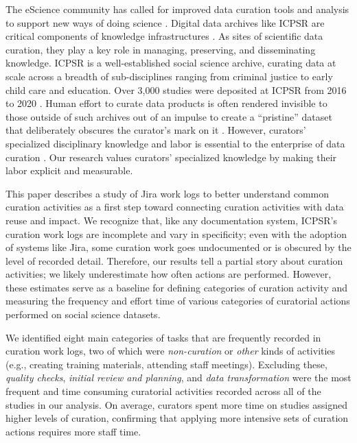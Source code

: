 \documentclass[conference]{IEEEtran}
\begin{document}
The eScience community has called for improved data curation tools and analysis to support new ways of doing science \cite{Hey2009-lk}. Digital data archives like ICPSR are critical components of knowledge infrastructures \cite{Borgman2019-ha}. As sites of scientific data curation, they play a key role in managing, preserving, and disseminating knowledge. ICPSR is a well-established social science archive, curating data at scale across a breadth of sub-disciplines ranging from criminal justice to early child care and education. Over 3,000 studies were deposited at ICPSR from 2016 to 2020 \cite{ICPSR-2020}. Human effort to curate data products is often rendered invisible to those outside of such archives out of an impulse to create a “pristine” dataset that deliberately obscures the curator’s mark on it \cite{Plantin2019-ba}. However, curators’ specialized disciplinary knowledge and labor is essential to the enterprise of data curation \cite{Cragin2010-ei}. Our research values curators’ specialized knowledge by making their labor explicit and measurable.

This paper describes a study of Jira work logs to better understand common curation activities as a first step toward connecting curation activities with data reuse and impact. We recognize that, like any documentation system, ICPSR’s curation work logs are incomplete and vary in specificity; even with the adoption of systems like Jira, some curation work goes undocumented or is obscured by the level of recorded detail. Therefore, our results tell a partial story about curation activities; we likely underestimate how often actions are performed. However, these estimates serve as a baseline for defining categories of curation activity and measuring the frequency and effort time of various categories of curatorial actions performed on social science datasets. 

We identified eight main categories of tasks that are frequently recorded in curation work logs, two of which were \textit{non-curation} or \textit{other} kinds of activities (e.g., creating training materials, attending staff meetings). Excluding these, \textit{quality checks}, \textit{initial review and planning}, and \textit{data transformation} were the most frequent and time consuming curatorial activities recorded across all of the studies in our analysis. On average, curators spent more time on studies assigned higher levels of curation, confirming that applying more intensive sets of curation actions requires more staff time. 
\end{document}
